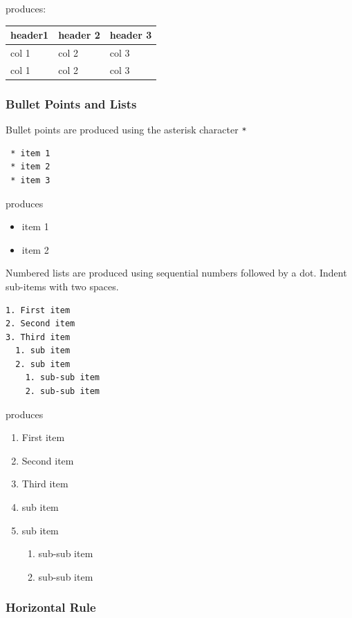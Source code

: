 \documentclass{book}
\providecommand{\tightlist}{%
      \setlength{\itemsep}{0pt}\setlength{\parskip}{0pt}}
\begin{document}
produces:

\begin{longtable}[]{@{}lll@{}}
\toprule
header1 & header 2 & header 3\tabularnewline
\midrule
\endhead
col 1 & col 2 & col 3\tabularnewline
col 1 & col 2 & col 3\tabularnewline
\bottomrule
\end{longtable}

\subsubsection{Bullet Points and Lists}\label{bullet-points-and-lists}

Bullet points are produced using the asterisk character \lstinline!*!

\begin{lstlisting}
 * item 1
 * item 2
 * item 3
\end{lstlisting}

produces

\begin{itemize}
\tightlist
\item
  item 1
\item
  item 2
\end{itemize}

Numbered lists are produced using sequential numbers followed by a dot.
Indent sub-items with two spaces.

\begin{lstlisting}
1. First item
2. Second item
3. Third item
  1. sub item
  2. sub item
    1. sub-sub item
    2. sub-sub item
\end{lstlisting}

produces

\begin{enumerate}
\def\labelenumi{\arabic{enumi}.}
\tightlist
\item
  First item
\item
  Second item
\item
  Third item
\item
  sub item
\item
  sub item

  \begin{enumerate}
  \def\labelenumii{\arabic{enumii}.}
  \tightlist
  \item
    sub-sub item
  \item
    sub-sub item
  \end{enumerate}
\end{enumerate}

\subsubsection{Horizontal Rule}\label{horizontal-rule}
\end{document}
